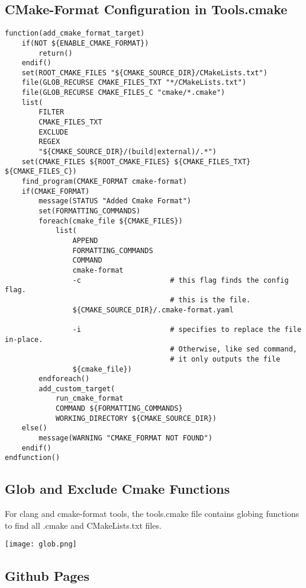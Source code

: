 \documentclass[openany]{report}
\begin{document}
\subsection{CMake-Format Configuration in Tools.cmake}


\begin{verbatim}
function(add_cmake_format_target)
    if(NOT ${ENABLE_CMAKE_FORMAT})
        return()
    endif()
    set(ROOT_CMAKE_FILES "${CMAKE_SOURCE_DIR}/CMakeLists.txt")
    file(GLOB_RECURSE CMAKE_FILES_TXT "*/CMakeLists.txt")
    file(GLOB_RECURSE CMAKE_FILES_C "cmake/*.cmake")
    list(
        FILTER
        CMAKE_FILES_TXT
        EXCLUDE
        REGEX
        "${CMAKE_SOURCE_DIR}/(build|external)/.*")
    set(CMAKE_FILES ${ROOT_CMAKE_FILES} ${CMAKE_FILES_TXT} ${CMAKE_FILES_C})
    find_program(CMAKE_FORMAT cmake-format)
    if(CMAKE_FORMAT)
        message(STATUS "Added Cmake Format")
        set(FORMATTING_COMMANDS)
        foreach(cmake_file ${CMAKE_FILES})
            list(
                APPEND
                FORMATTING_COMMANDS
                COMMAND
                cmake-format
                -c                     # this flag finds the config flag. 
                                       # this is the file.
                ${CMAKE_SOURCE_DIR}/.cmake-format.yaml

                -i                     # specifies to replace the file in-place.
                                       # Otherwise, like sed command,
                                       # it only outputs the file
                ${cmake_file})
        endforeach()
        add_custom_target(
            run_cmake_format
            COMMAND ${FORMATTING_COMMANDS}
            WORKING_DIRECTORY ${CMAKE_SOURCE_DIR})
    else()
        message(WARNING "CMAKE_FORMAT NOT FOUND")
    endif()
endfunction()
\end{verbatim}

\subsection{Glob and Exclude Cmake Functions}

For clang and cmake-format tools, the tools.cmake file contains globing functions to
find all .cmake and CMakeLists.txt files.


\begin{center}
    \texttt{[image: glob.png]}
\end{center}

\subsection{Github Pages}
\end{document}
